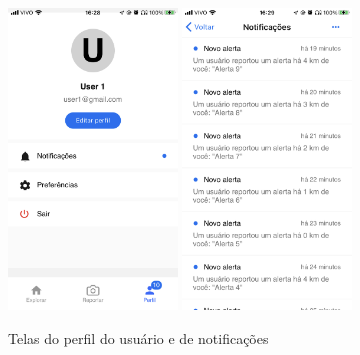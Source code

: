 \begin{figure}[htbp]
	\caption{\small Telas do perfil do usuário e de notificações} 
	\begin{center}
		\includegraphics[height=8cm]{images/lazarus-profile.png}
		\includegraphics[height=8cm]{images/lazarus-notifications.png}
	\end{center}
	\label{f.lazarus-profile}
\end{figure}

